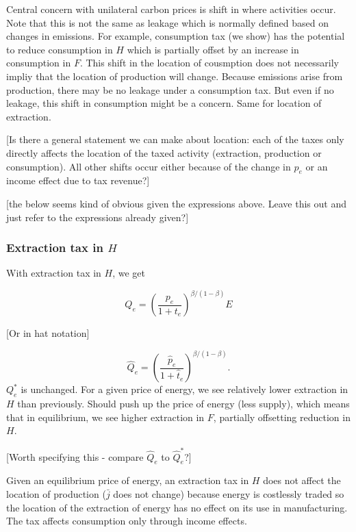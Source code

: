 \documentclass[notitlepage,12pt]{article}
\begin{document}
Central concern with unilateral carbon prices is shift in where activities
occur. Note that this is not the same as leakage which is normally defined
based on changes in emissions. For example, consumption tax (we show) has
the potential to reduce consumption in $H$ which is partially offset by an
increase in consumption in $F$. This shift in the location of cousmption
does not necessarily impliy that the location of production will change.
Because emissions arise from production, there may be no leakage under a
consumption tax. But even if no leakage, this shift in consumption might be
a concern. Same for location of extraction.

[Is there a general statement we can make about location: each of the taxes
only directly affects the location of the taxed activity (extraction,
production or consumption). All other shifts occur either because of the
change in $p_{e}$ or an income effect due to tax revenue?]

[the below seems kind of obvious given the expressions above. Leave this out
and just refer to the expressions already given?]

\subsubsection{Extraction tax in $H$}

With extraction tax in $H$, we get

\begin{equation*}
Q_{e}=\left( \frac{p_{e}}{1+t_{e}}\right) ^{\beta /\left( 1-\beta \right) }E
\end{equation*}

[Or in hat notation]

\begin{equation*}
\hat{Q}_{e}=\left( \frac{\hat{p}_{e}}{1+\hat{t}_{e}}\right) ^{\beta /\left(
1-\beta \right) }.
\end{equation*}%
$Q_{e}^{\ast }$ is unchanged. For a given price of energy, we see relatively
lower extraction in $H$ than previously. Should push up the price of energy
(less supply), which means that in equilibrium, we see higher extraction in $%
F$, partially offsetting reduction in $H$.

[Worth specifying this - compare $\hat{Q}_{e}$ to $\hat{Q}_{e}^{\ast }$?]

Given an equilibrium price of energy, an extraction tax in $H$ does not
affect the location of production ($\bar{j}$ does not change) because energy
is costlessly traded so the location of the extraction of energy has no
effect on its use in manufacturing. The tax affects consumption only through
income effects.
\end{document}
